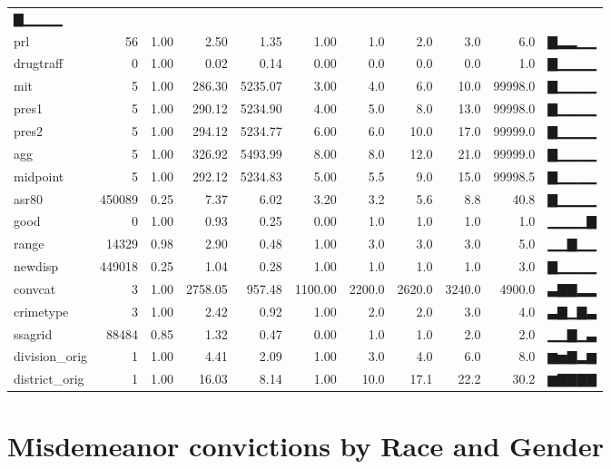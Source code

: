 \documentclass[
]{article}
\newenvironment{Shaded}{\begin{snugshade}}{\end{snugshade}}
\newcommand{\DataTypeTok}[1]{\textcolor[rgb]{0.13,0.29,0.53}{#1}}
\newcommand{\DecValTok}[1]{\textcolor[rgb]{0.00,0.00,0.81}{#1}}
\newcommand{\KeywordTok}[1]{\textcolor[rgb]{0.13,0.29,0.53}{\textbf{#1}}}
\newcommand{\NormalTok}[1]{#1}
\newcommand{\OperatorTok}[1]{\textcolor[rgb]{0.81,0.36,0.00}{\textbf{#1}}}
\newcommand{\StringTok}[1]{\textcolor[rgb]{0.31,0.60,0.02}{#1}}
\begin{document}
\begin{longtable}[]{@{}lrrrrrrrrrl@{}}
▇▁▁▁▁\tabularnewline
prl & 56 & 1.00 & 2.50 & 1.35 & 1.00 & 1.0 & 2.0 & 3.0 & 6.0 &
▇▂▂▁▁\tabularnewline
drugtraff & 0 & 1.00 & 0.02 & 0.14 & 0.00 & 0.0 & 0.0 & 0.0 & 1.0 &
▇▁▁▁▁\tabularnewline
mit & 5 & 1.00 & 286.30 & 5235.07 & 3.00 & 4.0 & 6.0 & 10.0 & 99998.0 &
▇▁▁▁▁\tabularnewline
pres1 & 5 & 1.00 & 290.12 & 5234.90 & 4.00 & 5.0 & 8.0 & 13.0 & 99998.0
& ▇▁▁▁▁\tabularnewline
pres2 & 5 & 1.00 & 294.12 & 5234.77 & 6.00 & 6.0 & 10.0 & 17.0 & 99999.0
& ▇▁▁▁▁\tabularnewline
agg & 5 & 1.00 & 326.92 & 5493.99 & 8.00 & 8.0 & 12.0 & 21.0 & 99999.0 &
▇▁▁▁▁\tabularnewline
midpoint & 5 & 1.00 & 292.12 & 5234.83 & 5.00 & 5.5 & 9.0 & 15.0 &
99998.5 & ▇▁▁▁▁\tabularnewline
asr80 & 450089 & 0.25 & 7.37 & 6.02 & 3.20 & 3.2 & 5.6 & 8.8 & 40.8 &
▇▁▁▁▁\tabularnewline
good & 0 & 1.00 & 0.93 & 0.25 & 0.00 & 1.0 & 1.0 & 1.0 & 1.0 &
▁▁▁▁▇\tabularnewline
range & 14329 & 0.98 & 2.90 & 0.48 & 1.00 & 3.0 & 3.0 & 3.0 & 5.0 &
▁▁▇▁▁\tabularnewline
newdisp & 449018 & 0.25 & 1.04 & 0.28 & 1.00 & 1.0 & 1.0 & 1.0 & 3.0 &
▇▁▁▁▁\tabularnewline
convcat & 3 & 1.00 & 2758.05 & 957.48 & 1100.00 & 2200.0 & 2620.0 &
3240.0 & 4900.0 & ▃▇▇▂▂\tabularnewline
crimetype & 3 & 1.00 & 2.42 & 0.92 & 1.00 & 2.0 & 2.0 & 3.0 & 4.0 &
▃▇▁▇▃\tabularnewline
ssagrid & 88484 & 0.85 & 1.32 & 0.47 & 0.00 & 1.0 & 1.0 & 2.0 & 2.0 &
▁▁▇▁▃\tabularnewline
division\_orig & 1 & 1.00 & 4.41 & 2.09 & 1.00 & 3.0 & 4.0 & 6.0 & 8.0 &
▆▅▇▂▆\tabularnewline
district\_orig & 1 & 1.00 & 16.03 & 8.14 & 1.00 & 10.0 & 17.1 & 22.2 &
30.2 & ▆▇▇▇▇\tabularnewline
\bottomrule
\end{longtable}

\hypertarget{misdemeanor-convictions-by-race-and-gender}{%
\section{Misdemeanor convictions by Race and
Gender}\label{misdemeanor-convictions-by-race-and-gender}}

\begin{Shaded}
\end{Shaded}
\end{document}
